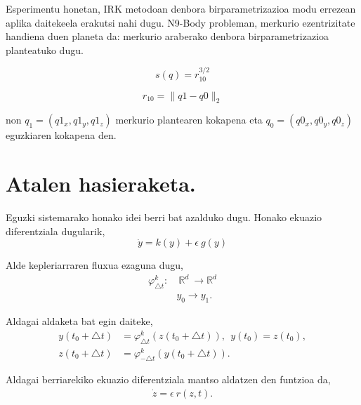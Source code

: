 Esperimentu honetan, IRK metodoan denbora birparametrizazioa modu errezean aplika daitekeela erakutsi nahi dugu. N9-Body probleman, merkurio ezentrizitate handiena duen planeta da: merkurio araberako denbora birparametrizazioa planteatuko dugu.

\begin{equation}
s(q)=r_{10}^{3/2}
\end{equation}

\begin{equation}
r_{10}=\|q1-q0\|_2
\end{equation}

non $q_1=(q1_{x},q1_{y},q1_{z})$ merkurio plantearen kokapena eta $q_0=(q0_{x},q0_{y},q0_{z})$ eguzkiaren kokapena den.

\section{Atalen hasieraketa.}

Eguzki sistemarako honako idei berri bat azalduko dugu. Honako ekuazio diferentziala dugularik,
\begin{equation*}
\dot{y}=k(y)+\epsilon \ g(y)
\end{equation*}

Alde kepleriarraren fluxua ezaguna dugu,
\begin{align*}
\varphi_{\triangle t}^k:&  \ \mathbb{R}^d \ \longrightarrow \mathbb{R}^d  \\
&  y_0 \longrightarrow y_1. 
\end{align*}

Aldagai aldaketa bat egin daiteke,
\begin{align*}
y(t_0+\triangle t) &= \varphi _{\triangle t}^k(z(t_0+\triangle t)), \ \ y(t_0)=z(t_0), \\
z(t_0+\triangle t) &= \varphi _{-\triangle t}^k(y(t_0+\triangle t)).
\end{align*}

Aldagai berriarekiko ekuazio diferentziala mantso aldatzen den funtzioa da,
\begin{align*}
\dot{z}=\epsilon \ r(z,t).
\end{align*} 

